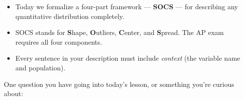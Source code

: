 \documentclass[10pt]{article}
\begin{document}
\vspace{0.1in}

\begin{tcolorbox}[colback=greenbg, colframe=greenacc, boxrule=0.8pt, arc=2mm,
    left=4mm, right=4mm, top=3mm, bottom=3mm]
\small
\begin{itemize}[leftmargin=1.3em, itemsep=5pt]
  \item Today we formalize a four-part framework --- \textbf{SOCS} --- for
        describing any quantitative distribution completely.
  \item SOCS stands for \textbf{S}hape, \textbf{O}utliers, \textbf{C}enter,
        and \textbf{S}pread. The AP exam requires all four components.
  \item Every sentence in your description must include \textit{context}
        (the variable name and population).
\end{itemize}
\end{tcolorbox}

\vspace{0.1in}

\noindent\textcolor{slate}{\small One question you have going into today's lesson,
or something you're curious about:}\\[8pt]
\writeline
\end{document}
